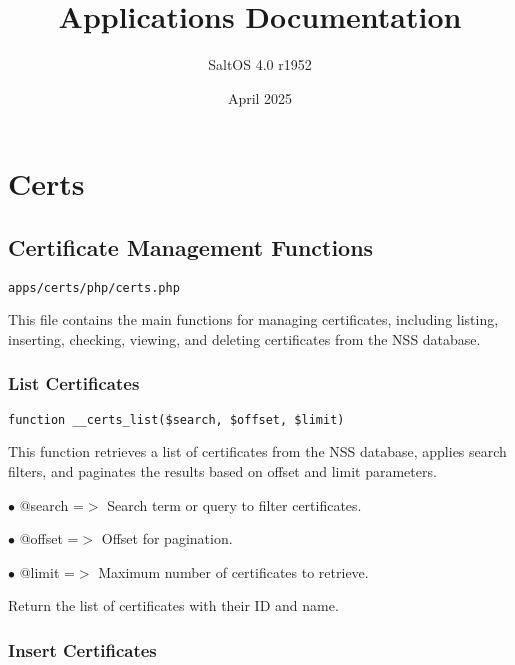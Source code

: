\documentclass[a4paper]{article}
\title{Applications Documentation}
\author{SaltOS 4.0 r1952}
\begin{document}
\date{April 2025}
\maketitle
\clearpage

\tableofcontents
\clearpage


\hypertarget{toc1}{}
\section{Certs}

\hypertarget{toc2}{}
\subsection{Certificate Management Functions}

\begin{lstlisting}
apps/certs/php/certs.php
\end{lstlisting}

This file contains the main functions for managing certificates, including listing,
inserting, checking, viewing, and deleting certificates from the NSS database.

\hypertarget{toc3}{}
\subsubsection{List Certificates}

\begin{lstlisting}
function __certs_list($search, $offset, $limit)
\end{lstlisting}

This function retrieves a list of certificates from the NSS database, applies search filters,
and paginates the results based on offset and limit parameters.

\begin{compactitem}
\item[\color{myblue}$\bullet$] @search =$>$ Search term or query to filter certificates.
\item[\color{myblue}$\bullet$] @offset =$>$ Offset for pagination.
\item[\color{myblue}$\bullet$] @limit  =$>$ Maximum number of certificates to retrieve.
\end{compactitem}

Return the list of certificates with their ID and name.

\hypertarget{toc4}{}
\subsubsection{Insert Certificates}
\end{document}

